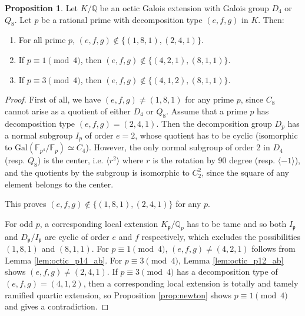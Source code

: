 \documentclass[letterpaper, 10pt]{article}
\newcommand{\Gal}{\mathrm{Gal}}
\newcommand{\bF}{\mathbb{F}}
\newcommand{\bQ}{\mathbb{Q}}
\newcommand{\frp}{\mathfrak{p}}
\newcommand{\1}{\mathds{1}}	%
\theoremstyle{definition}
\newtheorem{proposition}[theorem]{Proposition}
\theoremstyle{remark}
\begin{document}
\begin{proposition}
    \label{prop:D4Q8ram}
    Let $K / \bQ$ be an octic Galois extension with Galois group $D_4$ or $Q_8$. Let $p$ be a rational prime with decomposition type $(e, f, g)$ in $K$. Then:
    \begin{enumerate}
        \item  For all prime $p$, $(e, f, g) \not \in \{(1, 8, 1), (2, 4, 1)\}$.
        \item If $p \equiv 1 \pmod{4}$, then $(e, f, g) \not \in \{(4, 2, 1), (8, 1, 1)\}$.
        \item If $p \equiv 3 \pmod{4}$, then $(e, f, g) \not \in \{(4, 1, 2), (8, 1, 1)\}$.
    \end{enumerate}
\end{proposition}
\begin{proof}
    First of all, we have \( (e, f, g) \ne (1, 8, 1) \) for any prime \(p\), since \(C_8\) cannot arise as a quotient of either \(D_4\) or \(Q_8\).
     Assume that a prime $p$ has decomposition type $(e, f, g) = (2, 4, 1)$. Then the decomposition group $D_p$ has a normal subgroup $I_p$ of order $e = 2$, whose quotient has to be cyclic (isomorphic to $\Gal(\bF_{p^4} / \bF_p) \simeq C_4$). However, the only normal subgroup of order 2 in $D_4$ (resp. $Q_8$) is the center, i.e. $\langle r^2 \rangle$ where $r$ is the rotation by 90 degree (resp. $\langle -1 \rangle$), and the quotients by the subgroup is isomorphic to $C_2^2$, since the square of any element belongs to the center.

    This proves $(e, f, g) \not \in \{(1, 8, 1), (2, 4, 1)\}$ for  any $p$.

    For odd $p$, a corresponding local extension $K_\frp / \bQ_p$ has to be tame and so both $I_\frp$ and $D_\frp / I_\frp$ are cyclic of order $e$ and $f$ respectively, which excludes the possibilities $(1, 8, 1)$ and $(8, 1, 1)$.
    For $p \equiv 1 \pmod{4}$, $(e, f, g) \ne (4, 2, 1)$ follows from Lemma \ref{lem:octic_p14_ab}.
    For $p \equiv 3 \pmod{4}$, Lemma \ref{lem:octic_p12_ab} shows $(e, f, g) \ne (2, 4, 1)$.
    If $p \equiv 3 \pmod{4}$ has a decomposition type of $(e, f, g) = (4, 1, 2)$, then a corresponding local extension is totally and tamely ramified quartic extension, so Proposition \ref{prop:newton} shows $p \equiv 1 \pmod{4}$ and gives a contradiction.
\end{proof}
\end{document}
